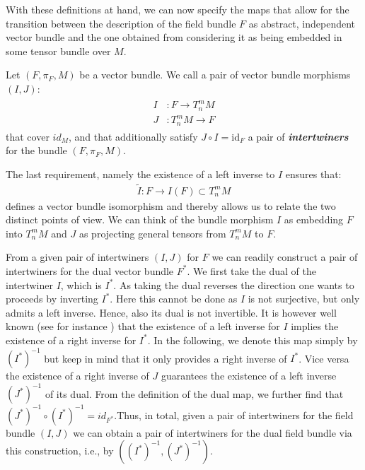 With these definitions at hand, we can now specify the maps that allow for the transition between the description of the field bundle $F$ as abstract, independent vector bundle and the one obtained from considering it as being embedded in some tensor bundle over $M$.
\begin{definition}[intertwiner]\label{interDef}
Let $(F,\pi_F,M)$ be a vector bundle. We call a pair of vector bundle morphisms $(I, J)$:
\begin{align}
    \begin{aligned}
    I&: F \longrightarrow T^m_n M\\
    J&: T^m_n M \longrightarrow F 
    \end{aligned}
\end{align}
that cover $id_M$, and that additionally satisfy
$J \circ I = \mathrm{id}_F$ a pair of \textbf{\textit{intertwiners}} for the bundle $(F, \pi_F, M)$.
\end{definition}
The last requirement, namely the existence of a left inverse to $I$ ensures that: 
\begin{align}\tilde{I} : F \longrightarrow I(F) \subset T^m_nM
\end{align}
defines a vector bundle isomorphism and thereby allows us to relate the two distinct points of view.
We can think of the bundle morphism $I$ as embedding $F$ into $T^m_nM$ and $J$ as projecting general tensors from $T^m_nM$ to $F$. 

From a given pair of intertwiners $(I,J)$ for $F$ we can readily construct a pair of intertwiners for the dual vector bundle $F^{\ast}$. 
We first take the dual of the intertwiner $I$, which is $I^{\ast}$. As taking the dual reverses the direction one wants to proceeds by inverting $I^{\ast}$. Here this cannot be done as $I$ is not surjective, but only admits a left inverse. Hence, also its dual is not invertible. It is however well known (see for instance \cite{MacLane:205493}) that the existence of a left inverse for $I$ implies the existence of a right inverse for $I^{\ast}$. 
In the following, we denote this map simply by $(I^{\ast})^{-1}$ but keep in mind that it only provides a right inverse of $I^{\ast}$. Vice versa the existence of a right inverse of $J$ guarantees the existence of a left inverse $(J^{\ast})^{-1}$ of its dual. From the definition of the dual map, we further find that $(J^{\ast})^{-1} \circ (I^{\ast})^{-1} = id_{F^{\ast}}$.Thus, in total, given a pair of intertwiners for the field bundle $(I,J)$ we can obtain a pair of intertwiners for the dual field bundle via this construction, i.e., by $((I^{\ast})^{-1}, (J^{\ast})^{-1})$. 

